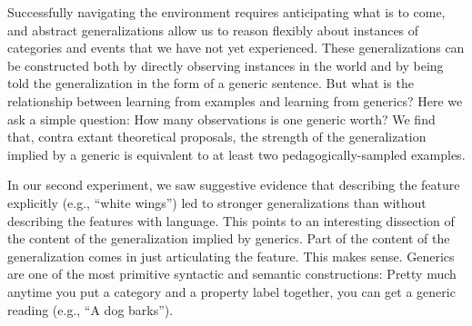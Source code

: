 \documentclass[10pt,letterpaper]{article}
\begin{document}
Successfully navigating the environment requires anticipating what is to come, and abstract generalizations allow us to reason flexibly about instances of categories and events that we have not yet experienced. 
These generalizations can be constructed both by directly observing instances in the world and by being told the generalization in the form of a generic sentence. 
But what is the relationship between learning from examples and learning from generics? 
Here we ask a simple question: How many observations is one generic worth?
We find that, contra extant theoretical proposals, the strength of the generalization implied by a generic is equivalent to at least two pedagogically-sampled examples. 

In our second experiment, we saw suggestive evidence that describing the feature explicitly (e.g., ``white wings'') led to stronger generalizations than without describing the features with language. 
This points to an interesting dissection of the content of the generalization implied by generics. Part of the content of the generalization comes in just articulating the feature. This makes sense.  Generics are one of the most primitive syntactic and semantic constructions: Pretty much anytime you put a category and a property label together, you can get a generic reading (e.g., ``A dog barks''). 
\end{document}

